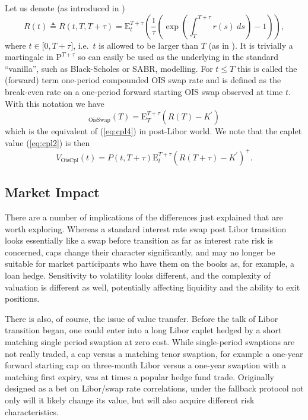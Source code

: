 \documentclass{article}
\begin{document}
Let us denote (as introduced in \cite{lyas-merc-l}) 
\begin{equation}
R(t)\triangleq R(t,T,T+\tau )=\mathrm{E}_{t}^{T+\tau }\left( \frac{1}{\tau }%
\left( \exp \left( \int_{T}^{T+\tau }r(s)~ds\right) -1\right) \right) ,
\label{eq:termois1}
\end{equation}%
where $t\in \lbrack 0,T+\tau ]$, i.e.~$t$ is allowed to be larger than $T$
(as in \cite{lyas-merc-l}). It is trivially a martingale in $\mathrm{P}%
^{T+\tau }$ so can easily be used as the underlying in the standard
\textquotedblleft vanilla\textquotedblright , such as Black-Scholes or SABR,
modelling.  For $t\leq T$ this is called the (forward) term one-period
compounded OIS swap rate and is defined as the break-even rate on a
one-period forward starting OIS swap observed at time $t$. With this
notation we have%
\begin{equation*}
_{\mathrm{OisSwap}}(T)=\mathrm{E}_{T}^{T+\tau }\left( R(T)-K^{\prime
}\right) 
\end{equation*}%
which is the equivalent of (\ref{eq:cpl4}) in post-Libor world. We note that
the caplet value (\ref{eq:cpl2}) is then%
\begin{equation*}
V_{\mathrm{OisCpl}}(t)=P(t,T+\tau )\mathrm{E}_{t}^{T+\tau }\left( R(T+\tau
)-K^{\prime }\right) ^{+}.
\end{equation*}

\subsection{Market Impact}

There are a number of implications of the differences just explained that
are worth exploring. Whereas a standard interest rate swap post Libor
transition looks essentially like a swap before transition as far as
interest rate risk is concerned, caps change their character significantly,
and may no longer be suitable for market participants who have them on the
books as, for example, a loan hedge. Sensitivity to volatility looks
different, and the complexity of valuation is different as well, potentially
affecting liquidity and the ability to exit positions.

There is also, of course, the issue of value transfer. Before the talk of
Libor transition began, one could enter into a long Libor caplet hedged by a
short matching single period swaption at zero cost. While single-period
swaptions are not really traded, a cap versus a matching tenor swaption, for
example a one-year forward starting cap on three-month Libor versus a
one-year swaption with a matching first expiry, was at times a popular hedge
fund trade. Originally designed as a bet on Libor/swap rate correlations,
under the fallback protocol not only will it likely change its value, but
will also acquire different risk characteristics.
\end{document}
